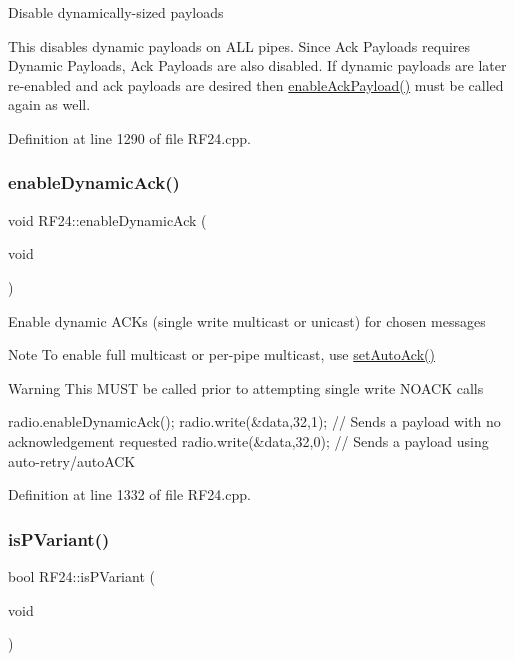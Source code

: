 Disable dynamically-\/sized payloads

This disables dynamic payloads on A\+LL pipes. Since Ack Payloads requires Dynamic Payloads, Ack Payloads are also disabled. If dynamic payloads are later re-\/enabled and ack payloads are desired then \hyperlink{classRF24_abf8efced2ee9edbcc6510878b20edc1b}{enable\+Ack\+Payload()} must be called again as well. 

Definition at line 1290 of file R\+F24.\+cpp.

\mbox{\label{classRF24_a6253607ac2a1995af91a35cea6899c31}} 
\subsubsection{\texorpdfstring{enable\+Dynamic\+Ack()}{enableDynamicAck()}}
{\footnotesize\ttfamily void R\+F24\+::enable\+Dynamic\+Ack (\begin{DoxyParamCaption}\item[{void}]{ }\end{DoxyParamCaption})}

Enable dynamic A\+C\+Ks (single write multicast or unicast) for chosen messages

\begin{DoxyNote}{Note}
To enable full multicast or per-\/pipe multicast, use \hyperlink{classRF24_aec71746d59da978bcbb975167886a2cc}{set\+Auto\+Ack()}
\end{DoxyNote}
\begin{DoxyWarning}{Warning}
This M\+U\+ST be called prior to attempting single write N\+O\+A\+CK calls 
\begin{DoxyCode}
radio.enableDynamicAck();
radio.write(&data,32,1);  \textcolor{comment}{// Sends a payload with no acknowledgement requested}
radio.write(&data,32,0);  \textcolor{comment}{// Sends a payload using auto-retry/autoACK}
\end{DoxyCode}
 
\end{DoxyWarning}


Definition at line 1332 of file R\+F24.\+cpp.

\mbox{\label{classRF24_a62846750b82682beb7593719eb60ed60}} 
\subsubsection{\texorpdfstring{is\+P\+Variant()}{isPVariant()}}
{\footnotesize\ttfamily bool R\+F24\+::is\+P\+Variant (\begin{DoxyParamCaption}\item[{void}]{ }\end{DoxyParamCaption})}

